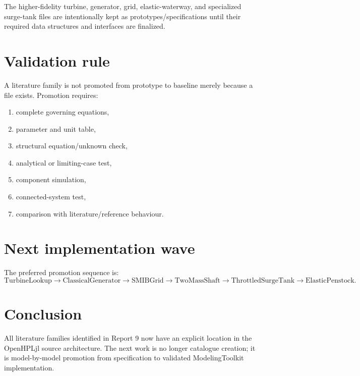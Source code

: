 \documentclass[10pt,a4paper]{article}
\begin{document}
The higher-fidelity turbine, generator, grid, elastic-waterway, and specialized
surge-tank files are intentionally kept as prototypes/specifications until their
required data structures and interfaces are finalized.

\section{Validation rule}
A literature family is not promoted from prototype to baseline merely because a
file exists. Promotion requires:
\begin{enumerate}
\item complete governing equations,
\item parameter and unit table,
\item structural equation/unknown check,
\item analytical or limiting-case test,
\item component simulation,
\item connected-system test,
\item comparison with literature/reference behaviour.
\end{enumerate}

\section{Next implementation wave}
The preferred promotion sequence is:
\[
\text{TurbineLookup}\rightarrow
\text{ClassicalGenerator}\rightarrow
\text{SMIBGrid}\rightarrow
\text{TwoMassShaft}\rightarrow
\text{ThrottledSurgeTank}\rightarrow
\text{ElasticPenstock}.
\]

\section*{Conclusion}
All literature families identified in Report 9 now have an explicit location in
the OpenHPLjl source architecture. The next work is no longer catalogue
creation; it is model-by-model promotion from specification to validated
ModelingToolkit implementation.
\end{document}
